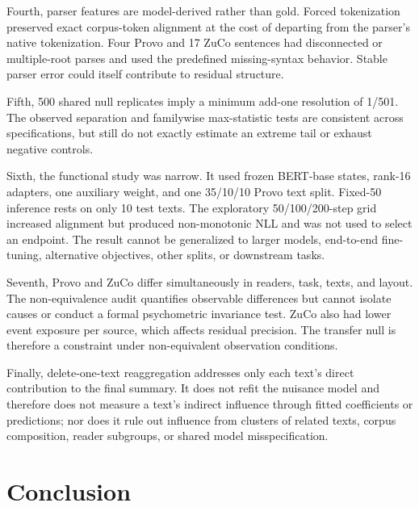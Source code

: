 \documentclass[11pt]{article}
\begin{document}
Fourth, parser features are model-derived rather than gold. Forced tokenization preserved exact corpus-token alignment at the cost of departing from the parser's native tokenization. Four Provo and 17 ZuCo sentences had disconnected or multiple-root parses and used the predefined missing-syntax behavior. Stable parser error could itself contribute to residual structure.

Fifth, 500 shared null replicates imply a minimum add-one resolution of 1/501. The observed separation and familywise max-statistic tests are consistent across specifications, but still do not exactly estimate an extreme tail or exhaust negative controls.

Sixth, the functional study was narrow. It used frozen BERT-base states, rank-16 adapters, one auxiliary weight, and one 35/10/10 Provo text split. Fixed-50 inference rests on only 10 test texts. The exploratory 50/100/200-step grid increased alignment but produced non-monotonic NLL and was not used to select an endpoint. The result cannot be generalized to larger models, end-to-end fine-tuning, alternative objectives, other splits, or downstream tasks.

Seventh, Provo and ZuCo differ simultaneously in readers, task, texts, and layout. The non-equivalence audit quantifies observable differences but cannot isolate causes or conduct a formal psychometric invariance test. ZuCo also had lower event exposure per source, which affects residual precision. The transfer null is therefore a constraint under non-equivalent observation conditions.

Finally, delete-one-text reaggregation addresses only each text's direct contribution to the final summary. It does not refit the nuisance model and therefore does not measure a text's indirect influence through fitted coefficients or predictions; nor does it rule out influence from clusters of related texts, corpus composition, reader subgroups, or shared model misspecification.

\section{Conclusion}
\end{document}
